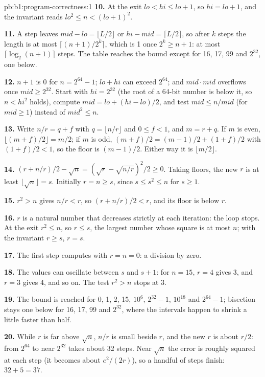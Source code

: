 \begin{solution}{pb:b1:program-correctness:1}
\textbf{10.} At the exit $lo < hi \leq lo + 1$, so $hi = lo + 1$, and the invariant reads $lo^2 \leq n < (lo + 1)^2$.

\textbf{11.} A step leaves $mid - lo = \lfloor L/2 \rfloor$ or $hi - mid = \lceil L/2 \rceil$, so after $k$ steps the
length is at most $\lceil (n + 1)/2^k \rceil$, which is 1 once $2^k \geq n + 1$: at most $\lceil \log_2(n + 1) \rceil$
steps. The table reaches the bound except for 16, 17, 99 and $2^{32}$, one below.

\textbf{12.} $n + 1$ is 0 for $n = 2^{64} - 1$; $lo + hi$ can exceed $2^{64}$; and $mid \cdot mid$ overflows once $mid
\geq 2^{32}$. Start with $hi = 2^{32}$ (the root of a 64-bit number is below it, so $n < hi^2$ holds), compute $mid = lo
+ (hi - lo)/2$, and test $mid \leq n / mid$ (for $mid \geq 1$) instead of $mid^2 \leq n$.

\textbf{13.} Write $n/r = q + f$ with $q = \lfloor n/r \rfloor$ and $0 \leq f < 1$, and $m = r + q$. If $m$ is even,
$\lfloor (m + f)/2 \rfloor = m/2$; if $m$ is odd, $(m + f)/2 = (m - 1)/2 + (1 + f)/2$ with $(1 + f)/2 < 1$, so the floor is
$(m - 1)/2$. Either way it is $\lfloor m/2 \rfloor$.

\textbf{14.} $(r + n/r)/2 - \sqrt{n} = (\sqrt{r} - \sqrt{n/r})^2/2 \geq 0$. Taking floors, the new $r$ is at least
$\lfloor \sqrt{n} \rfloor = s$. Initially $r = n \geq s$, since $s \leq s^2 \leq n$ for $s \geq 1$.

\textbf{15.} $r^2 > n$ gives $n/r < r$, so $(r + n/r)/2 < r$, and its floor is below $r$.

\textbf{16.} $r$ is a natural number that decreases strictly at each iteration: the loop stops. At the exit $r^2 \leq
n$, so $r \leq s$, the largest number whose square is at most $n$; with the invariant $r \geq s$, $r = s$.

\textbf{17.} The first step computes  with $r = n = 0$: a division by zero.

\textbf{18.} The values can oscillate between $s$ and $s + 1$: for $n = 15$, $r = 4$ gives 3, and $r = 3$ gives 4, and
so on. The test $r^2 > n$ stops at 3.

\textbf{19.} The bound is reached for 0, 1, 2, 15, $10^6$, $2^{32} - 1$, $10^{18}$ and $2^{64} - 1$; bisection stays
one below for 16, 17, 99 and $2^{32}$, where the intervals happen to shrink a little faster than half.

\textbf{20.} While $r$ is far above $\sqrt{n}$, $n/r$ is small beside $r$, and the new $r$ is about $r/2$: from $2^{64}$
to near $2^{32}$ takes about 32 steps. Near $\sqrt{n}$ the error is roughly squared at each step (it becomes about
$e^2/(2r)$), so a handful of steps finish: $32 + 5 = 37$.


\end{solution}
